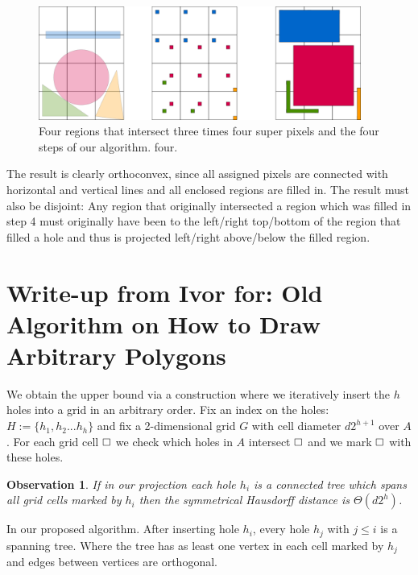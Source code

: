 \documentclass[a4paper, UKenglish]{lipics-v2018}
\newtheorem{observation}{Observation}
\newcommand{\pix}{\square}
\begin{document}
\begin{figure}[H]
\centering
\includegraphics[width=400px]{Figures/convexprojection.png}
\caption{Four regions that intersect three times four super pixels and the four steps of our algorithm. four.}
\label{fig:convexprojection}
\end{figure}

The result is clearly orthoconvex, since all assigned pixels are connected with horizontal and vertical lines and all enclosed regions are filled in. The result must also be disjoint: Any region that originally intersected a region which was filled in step 4 must originally have been to the left/right top/bottom of the region that filled a hole and thus is projected left/right above/below the filled region.



\section{Write-up from Ivor for: Old Algorithm on How to Draw Arbitrary Polygons}



We obtain the upper bound via a construction where we iteratively insert the $h$ holes into a grid in an arbitrary order.
Fix an index on the holes: $H := \{ h_1, h_2 ... h_h \}$ and fix a 2-dimensional grid $G$ with cell diameter $ d 2^{h+1}$ over $A$.
For each grid cell $\hfill\pix$ we check which holes in $A$ intersect $\hfill\pix$ and we mark $\hfill\pix$ with these holes.

\begin{observation}
If in our projection each hole $h_i$ is a connected tree which spans all grid cells marked by $h_i$ then the symmetrical Hausdorff distance is $\Theta(d2^h)$.
\end{observation}

\begin{definition}
In our proposed algorithm. After inserting hole $h_i$, every hole $h_j$ with $j \le i$ is a spanning tree. Where the tree has as least one vertex in each cell marked by $h_j$ and edges between vertices are orthogonal.
\end{definition}
\end{document}
